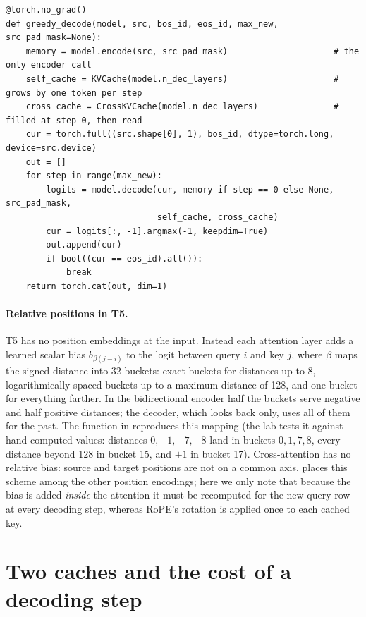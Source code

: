 \begin{lstlisting}[caption={Encode once, decode with two caches.},label={lst:encoders:greedy}]
@torch.no_grad()
def greedy_decode(model, src, bos_id, eos_id, max_new, src_pad_mask=None):
    memory = model.encode(src, src_pad_mask)                     # the only encoder call
    self_cache = KVCache(model.n_dec_layers)                     # grows by one token per step
    cross_cache = CrossKVCache(model.n_dec_layers)               # filled at step 0, then read
    cur = torch.full((src.shape[0], 1), bos_id, dtype=torch.long, device=src.device)
    out = []
    for step in range(max_new):
        logits = model.decode(cur, memory if step == 0 else None, src_pad_mask,
                              self_cache, cross_cache)
        cur = logits[:, -1].argmax(-1, keepdim=True)
        out.append(cur)
        if bool((cur == eos_id).all()):
            break
    return torch.cat(out, dim=1)
\end{lstlisting}

\paragraph{Relative positions in T5.} T5 has no position embeddings at the input. Instead each
attention layer adds a learned scalar bias $b_{\beta(j-i)}$ to the logit between query $i$ and key
$j$, where $\beta$ maps the signed distance into 32 buckets: exact buckets for distances up to 8,
logarithmically spaced buckets up to a maximum distance of 128, and one bucket for everything
farther. In the bidirectional encoder half the buckets serve negative and half positive distances;
the decoder, which looks back only, uses all of them for the past. The function
 in  reproduces this mapping (the lab tests
it against hand-computed values: distances $0,-1,-7,-8$ land in buckets $0,1,7,8$, every distance
beyond 128 in bucket 15, and $+1$ in bucket 17). Cross-attention has no relative bias: source and
target positions are not on a common axis.  places this scheme among the other
position encodings; here we only note that because the bias is added \emph{inside} the attention it
must be recomputed for the new query row at every decoding step, whereas RoPE's rotation is applied
once to each cached key.

\section{Two caches and the cost of a decoding step}\label{sec:encoders:caches}

